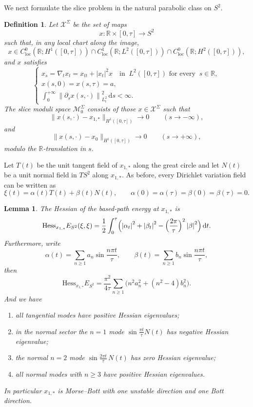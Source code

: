 \documentclass[11pt]{amsart}
\theoremstyle{plain}
\newtheorem{lem}[thm]{Lemma}
\newtheorem{defn}[thm]{Definition}
\theoremstyle{definition}
\newcommand{\R}{\mathbb{R}}
\newcommand{\dd}{\mathrm d}
\newcommand{\Abs}[1]{\left\lvert #1\right\rvert}
\newcommand{\norm}[1]{\left\lVert #1\right\rVert}
\begin{document}
We next formulate the slice problem in the natural parabolic class on $S^2$.


\begin{defn}
Let $\mathcal{X}^\Sigma$ be the set of maps
\[
x:\R\times[0,\tau]\longrightarrow S^2
\]
such that, in any local chart along the image,
\[
x\in C^0_{\mathrm{loc}}(\R;H^1([0,\tau]))
\cap C^1_{\mathrm{loc}}(\R;L^2([0,\tau]))
\cap C^0_{\mathrm{loc}}(\R;H^2([0,\tau])),
\]
and $x$ satisfies 
\begin{equation}\label{eq:sphere-heat}
\begin{cases}
 x_s=\nabla_t x_t=x_{tt}+|x_t|^2x \quad \text{in }~L^2([0,\tau]) \text{ for every }~s\in\R,\\[0.1cm]
x(s,0)=x(s,\tau)=a,
\\[0.1cm]
\int_0^{+\infty}\norm{\partial_s x(s,\cdot)}_{L^2_t}^2\,\dd s<\infty.  
\end{cases}    
\end{equation}
The slice moduli space $\mathcal{M}^\Sigma_0$ consists of those $x\in \mathcal{X}^\Sigma$ such that
\[
\|x(s,\cdot)-x_{1,*}\|_{H^1([0,\tau])}\longrightarrow 0
\qquad (s\to-\infty),
\]
and
\[
\|x(s,\cdot)-x_0\|_{H^1([0,\tau])}\longrightarrow 0
\qquad (s\to+\infty),
\]
modulo the $\R$-translation in $s$.
\end{defn}


Let $T(t)$ be the unit tangent field of $x_{1,*}$ along the great circle and let $N(t)$ be a unit normal field in $T S^2$ along $x_{1,*}$.
As before, every Dirichlet variation field can be written as
\[
\xi(t)=\alpha(t)T(t)+\beta(t)N(t),
\qquad
\alpha(0)=\alpha(\tau)=\beta(0)=\beta(\tau)=0.
\]

\begin{lem}\label{lem:hessian-once-round}
The Hessian of the based-path energy at $x_{1,*}$ is
\[
\mathrm{Hess}_{x_{1,*}}E_{S^2}(\xi,\xi)
=\frac12\int_0^\tau\Bigl(\Abs{\alpha_t}^2+\Abs{\beta_t}^2-\Bigl(\frac{2\pi}{\tau}\Bigr)^2\Abs{\beta}^2\Bigr)\,\dd t.
\]
Furthermore, write 
\[
\alpha(t)=\sum_{n\ge 1} a_n\sin\frac{n\pi t}{\tau},
\qquad
\beta(t)=\sum_{n\ge 1} b_n\sin\frac{n\pi t}{\tau},
\]
then
\[
\mathrm{Hess}_{x_{1,*}}E_{S^2}
=\frac{\pi^2}{4\tau}\sum_{n\ge 1}\bigl(n^2 a_n^2+(n^2-4)b_n^2\bigr).
\]
And we have
\begin{enumerate}[label=\textup{(\roman*)}]
\setlength{\itemsep}{-1pt}
    \item all tangential modes have positive Hessian eigenvalues;
    \item in the normal sector the $n=1$ mode $\sin\frac{\pi t}{\tau}N(t)$ has negative Hessian eigenvalue;
    \item the normal $n=2$ mode $\sin\frac{2\pi t}{\tau}\,N(t)$ has zero Hessian eigenvalue;
    \item all normal modes with $n\ge 3$ have positive Hessian eigenvalues.
\end{enumerate}
In particular $x_{1,*}$ is Morse--Bott with one unstable direction and one Bott direction.
\end{lem}
\end{document}
